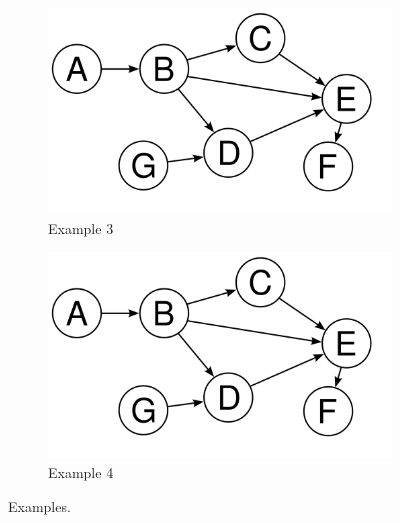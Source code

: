\begin{figure}[t]
	\begin{subfigure}{\columnwidth}
		\includegraphics[width=\columnwidth]{../gfx/example.png}
		\caption{Example 3}
		\label{figure:examples_3}
	\end{subfigure}
	\hfill
	\begin{subfigure}{\columnwidth}
		\includegraphics[width=\columnwidth]{../gfx/example.png}
		\caption{Example 4}
		\label{figure:examples_4}
	\end{subfigure}
	
	\caption{Examples.}
	\label{figure:examples}
\end{figure}